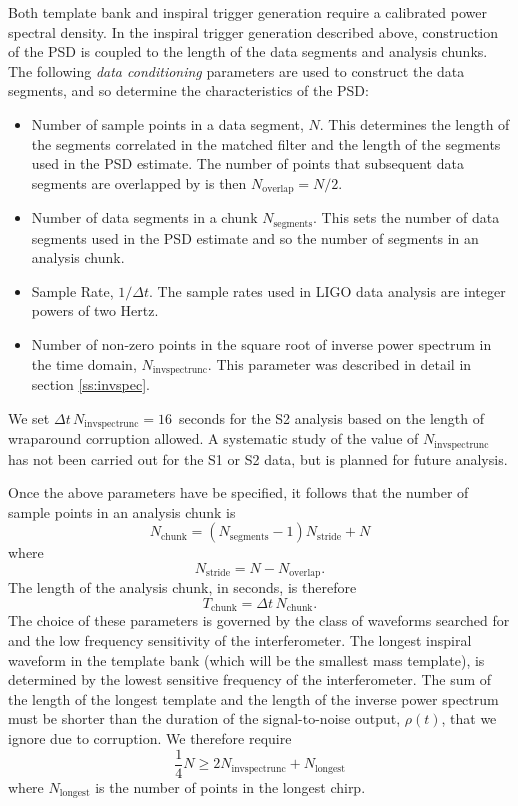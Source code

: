Both template bank and inspiral trigger generation require a calibrated power
spectral density. In the inspiral trigger generation described above,
construction of the PSD is coupled to the length of the data segments and
analysis chunks. The following \emph{data conditioning} parameters are used to
construct the data segments, and so determine the characteristics of the PSD:
\begin{itemize}
\item Number of sample points in a data segment, $N$. This determines the
length of the segments correlated in the matched filter and the length of the
segments used in the PSD estimate. The number of points that subsequent data
segments are overlapped by is then $N_\mathrm{overlap} = N/2$.

\item Number of data segments in a chunk $N_\mathrm{segments}$. This sets the
number of data segments used in the PSD estimate and so the number of segments
in an analysis chunk.

\item Sample Rate, $1/\Delta t$. The sample rates used in LIGO data analysis
are integer powers of two Hertz.

\item Number of non-zero points in the square root of inverse power
spectrum  in the time domain, $N_\mathrm{invspectrunc}$. This
parameter was described in detail in section \ref{ss:invspec}.
\end{itemize}
We set $\Delta t\, N_\mathrm{invspectrunc} = 16$~seconds for the S2 analysis
based on the length of wraparound corruption allowed. A systematic study of
the value of $N_\mathrm{invspectrunc}$ has not been carried out for the S1
or S2 data, but is planned for future analysis.

Once the above parameters have be specified, it follows that the number of
sample points in an analysis chunk is
\begin{equation}
N_\mathrm{chunk} = 
\left(N_\mathrm{segments} - 1 \right) N_\mathrm{stride} + N
\end{equation}
where 
\begin{equation}
N_\mathrm{stride} = N - N_\mathrm{overlap}.
\end{equation}
The length of the analysis chunk, in seconds, is therefore
\begin{equation}
T_\mathrm{chunk} = \Delta t\, N_\mathrm{chunk} .
\end{equation}
The choice of these parameters is governed by the class of waveforms searched
for and the low frequency sensitivity of the interferometer. The longest
inspiral waveform in the template bank (which will be the smallest mass
template), is determined by the lowest sensitive frequency of the
interferometer. The sum of the length of the longest template and the length
of the inverse power spectrum must be shorter than the duration of the
signal-to-noise output, $\rho(t)$, that we ignore due to corruption. We
therefore require
\begin{equation}
\frac{1}{4} N \ge 2 N_\mathrm{invspectrunc} + N_\mathrm{longest}
\end{equation}
where $N_\mathrm{longest}$ is the number of points in the longest chirp.

